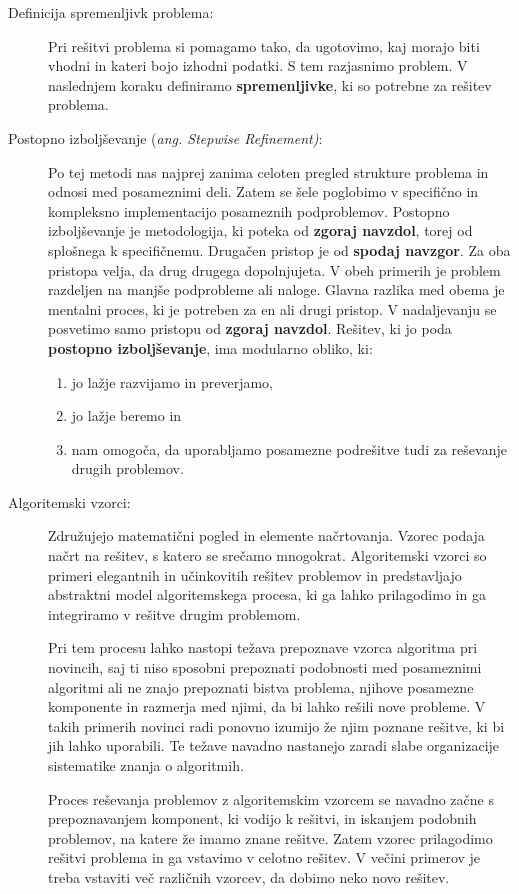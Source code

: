 \begin{description}
\item [Definicija spremenljivk problema:] Pri rešitvi problema
  si pomagamo tako, da ugotovimo, kaj morajo biti vhodni in kateri bojo
  izhodni podatki. S tem razjasnimo problem. V naslednjem koraku
  definiramo \textbf{spremenljivke}, ki so potrebne za rešitev
  problema.
\item [Postopno izboljševanje (\emph{ang. Stepwise
      Refinement)}:]Po tej metodi nas najprej zanima celoten pregled
  strukture problema in odnosi med posameznimi deli. Zatem se šele
  poglobimo v specifično in kompleksno implementacijo posameznih podproblemov. Postopno izboljševanje je metodologija, ki poteka od
  \textbf{zgoraj navzdol}, torej od splošnega k specifičnemu. Drugačen
  pristop je od \textbf{spodaj navzgor}. Za oba pristopa velja, da drug
  drugega dopolnjujeta. V obeh primerih je problem razdeljen na manjše
  podprobleme ali naloge. Glavna razlika med obema je mentalni
  proces, ki je potreben za en ali drugi pristop. V nadaljevanju se
  posvetimo samo pristopu od \textbf{zgoraj navzdol}. Rešitev, ki jo
  poda \textbf{postopno izboljševanje}, ima modularno obliko, ki:
  \begin{enumerate}
    \tightlist
  \item jo lažje razvijamo in preverjamo,
  \item jo lažje beremo in
  \item nam omogoča, da uporabljamo posamezne podrešitve tudi za
    reševanje drugih problemov.
  \end{enumerate}
\item [Algoritemski vzorci:] Združujejo
  matematični pogled in elemente načrtovanja. Vzorec podaja načrt na
  rešitev, s katero se srečamo mnogokrat. Algoritemski vzorci so
  primeri elegantnih in učinkovitih rešitev problemov in predstavljajo
  abstraktni model algoritemskega procesa, ki ga lahko prilagodimo
  in ga integriramo v rešitve drugim problemom.

  Pri tem procesu lahko nastopi težava prepoznave vzorca algoritma pri
  novincih, saj ti niso sposobni prepoznati podobnosti med posameznimi
  algoritmi ali ne znajo prepoznati bistva problema, njihove posamezne
  komponente in razmerja med njimi, da bi lahko rešili nove
  probleme. V takih primerih novinci radi ponovno izumijo že njim
  poznane rešitve, ki bi jih lahko uporabili. Te težave navadno
  nastanejo zaradi slabe organizacije sistematike znanja o algoritmih.

  Proces reševanja problemov z algoritemskim vzorcem se navadno začne
  s prepoznavanjem komponent, ki vodijo k rešitvi, in iskanjem podobnih
  problemov, na katere že imamo znane rešitve. Zatem 
  vzorec prilagodimo rešitvi problema in ga vstavimo v celotno
  rešitev. V večini primerov je treba vstaviti več različnih
  vzorcev, da dobimo neko novo rešitev.
\end{description}

